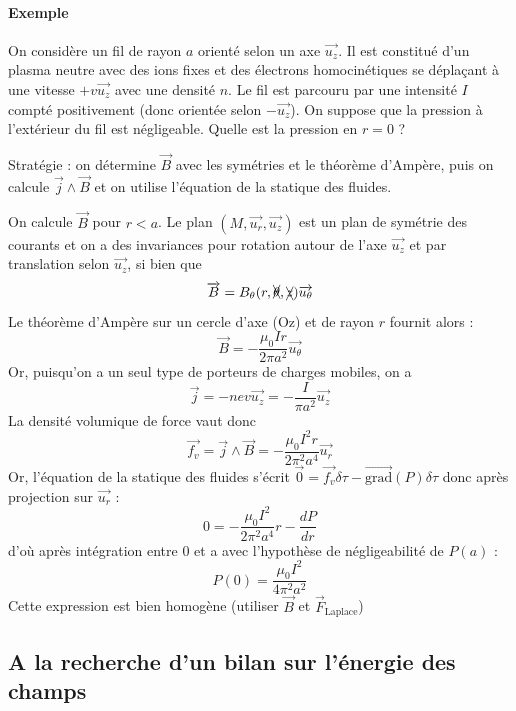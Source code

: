 \documentclass[french]{book}
\theoremstyle{plain}
\theoremstyle{definition}
\theoremstyle{remark}
\newcommand{\grad}{\overrightarrow{\text{grad}}}
\begin{document}
\paragraph{Exemple}On considère un fil de rayon $a$ orienté selon un axe $\overrightarrow{u_z}$. Il est constitué d'un plasma neutre avec des ions fixes et des électrons homocinétiques se déplaçant à une vitesse $+v\overrightarrow{u_z}$ avec une densité $n$. Le fil est parcouru par une intensité $I$ compté positivement (donc orientée selon $-\overrightarrow{u_z}$). On suppose que la pression à l'extérieur du fil est négligeable. Quelle est la pression en $r=0$ ? \\ \par Stratégie : on détermine $\overrightarrow{B}$ avec les symétries et le théorème d'Ampère, puis on calcule $\overrightarrow{j}\wedge\overrightarrow{B}$ et on utilise l'équation de la statique des fluides. \\ \par On calcule $\overrightarrow{B}$ pour $r<a$. Le plan $(M,\overrightarrow{u_r},\overrightarrow{u_z})$ est un plan de symétrie des courants et on a des invariances pour rotation autour de l'axe $\overrightarrow{u_z}$ et par translation selon $\overrightarrow{u_z}$, si bien que $$\overrightarrow{B}=B_\theta(r,\xcancel{\theta},\xcancel{z})\overrightarrow{u_\theta}$$ Le théorème d'Ampère sur un cercle d'axe (Oz) et de rayon $r$ fournit alors : $$\overrightarrow{B}=-\frac{\mu_0 I r}{2\pi a^2}\overrightarrow{u_\theta}$$ Or, puisqu'on a un seul type de porteurs de charges mobiles, on a $$\overrightarrow{j}=-nev\overrightarrow{u_z}=-\frac{I}{\pi a^2}\overrightarrow{u_z}$$ La densité volumique de force vaut donc $$\overrightarrow{f_v}=\overrightarrow{j}\wedge\overrightarrow{B}=-\frac{\mu_0 I^2 r}{2\pi^2 a^4}\overrightarrow{u_r}$$ Or, l'équation de la statique des fluides s'écrit $\overrightarrow{0}=\overrightarrow{f_v}\delta\tau-\grad(P)\delta\tau$ donc après projection sur $\overrightarrow{u_r}$ : $$0=-\frac{\mu_0 I^2}{2\pi^2 a^4}r-\frac{dP}{dr}$$ d'où après intégration entre 0 et a avec l'hypothèse de négligeabilité de $P(a)$ : $$P(0)=\frac{\mu_0 I^2}{4\pi^2 a^2}$$ Cette expression est bien homogène (utiliser $\overrightarrow{B}$ et $\overrightarrow{F}_\text{Laplace}$)
\subsection{A la recherche d'un bilan sur l'énergie des champs}
\end{document}
